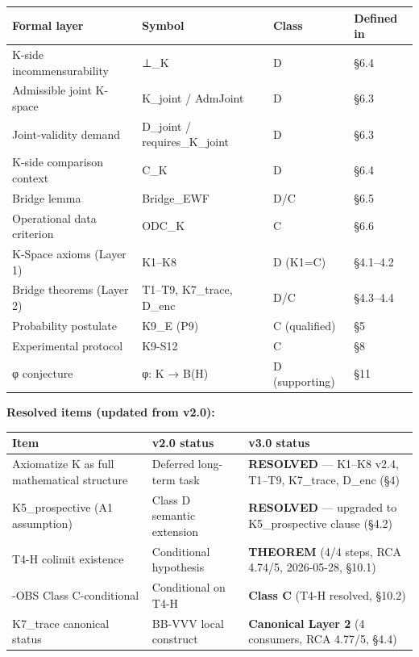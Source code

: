 \documentclass[
  11pt,
]{article}
\newcounter{none} %
\begin{document}
{\def\LTcaptype{none} %
\begin{longtable}[]{@{}llll@{}}
\toprule\noalign{}
Formal layer & Symbol & Class & Defined in \\
\midrule\noalign{}
\endhead
\bottomrule\noalign{}
\endlastfoot
K-side incommensurability & ⊥\_K & D & §6.4 \\
Admissible joint K-space & K\_joint / AdmJoint & D & §6.3 \\
Joint-validity demand & D\_joint / requires\_K\_joint & D & §6.3 \\
K-side comparison context & C\_K & D & §6.4 \\
Bridge lemma & Bridge\_EWF & D/C & §6.5 \\
Operational data criterion & ODC\_K & C & §6.6 \\
K-Space axioms (Layer 1) & K1--K8 & D (K1=C) & §4.1--4.2 \\
Bridge theorems (Layer 2) & T1--T9, K7\_trace, D\_enc & D/C &
§4.3--4.4 \\
Probability postulate & K9\_E (P9) & C (qualified) & §5 \\
Experimental protocol & K9-S12 & C & §8 \\
φ conjecture & φ: K → B(H) & D (supporting) & §11 \\
\end{longtable}
}

\textbf{Resolved items (updated from v2.0):}

{\def\LTcaptype{none} %
\begin{longtable}[]{@{}
  >{\raggedright\arraybackslash}p{}
  >{\raggedright\arraybackslash}p{}
  >{\raggedright\arraybackslash}p{}@{}}
\toprule\noalign{}
\begin{minipage}[b]{\linewidth}\raggedright
Item
\end{minipage} & \begin{minipage}[b]{\linewidth}\raggedright
v2.0 status
\end{minipage} & \begin{minipage}[b]{\linewidth}\raggedright
v3.0 status
\end{minipage} \\
\midrule\noalign{}
\endhead
\bottomrule\noalign{}
\endlastfoot
Axiomatize K as full mathematical structure & Deferred long-term task &
\textbf{RESOLVED} --- K1--K8 v2.4, T1--T9, K7\_trace, D\_enc (§4) \\
K5\_prospective (A1 assumption) & Class D semantic extension &
\textbf{RESOLVED} --- upgraded to K5\_prospective clause (§4.2) \\
T4-H colimit existence & Conditional hypothesis & \textbf{THEOREM} (4/4
steps, RCA 4.74/5, 2026-05-28, §10.1) \\
3-OBS Class C-conditional & Conditional on T4-H & \textbf{Class C} (T4-H
resolved, §10.2) \\
K7\_trace canonical status & BB-VVV local construct & \textbf{Canonical
Layer 2} (4 consumers, RCA 4.77/5, §4.4) \\
\end{longtable}
}
\end{document}
